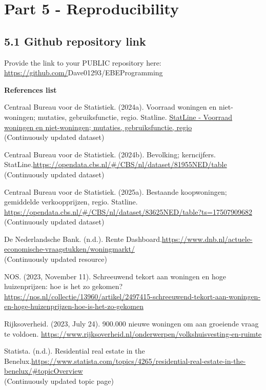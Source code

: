 \documentclass[
]{article}
\begin{document}
\section{Part 5 - Reproducibility}\label{part-5---reproducibility}

\subsection{5.1 Github repository link}\label{github-repository-link}

Provide the link to your PUBLIC repository here:
\url{https://github.com/}Dave01293/EBEProgramming

\textbf{References list}

Centraal Bureau voor de Statistiek. (2024a). Voorraad woningen en
niet-woningen; mutaties, gebruiksfunctie, regio. Statline.
\href{https://opendata.cbs.nl/statline/\#/CBS/nl/dataset/37230NED/table?fromstatweb}{StatLine
- Voorraad woningen en niet-woningen; mutaties, gebruiksfunctie, regio\\
} (Continuously updated dataset)

Centraal Bureau voor de Statistiek. (2024b). Bevolking; kerncijfers.
StatLine.\href{https://opendata.cbs.nl/\#/CBS/nl/dataset/81955NED/table}{https://opendata.cbs.nl/\#/CBS/nl/dataset/81955NED/table\\
} (Continuously updated dataset)

Centraal Bureau voor de Statistiek. (2025a). Bestaande koopwoningen;
gemiddelde verkoopprijzen, regio. Statline.
\url{https://opendata.cbs.nl/\#/CBS/nl/dataset/83625NED/table?ts=17507909682}\\
(Continuously updated dataset)

De Nederlandsche Bank. (n.d.). Rente \textbar{}
Dashboard.\href{https://www.dnb.nl/actuele-economische-vraagstukken/woningmarkt/}{https://www.dnb.nl/actuele-economische-vraagstukken/woningmarkt/\\
} (Continuously updated resource)

NOS. (2023, November 11). Schreeuwend tekort aan woningen en hoge
huizenprijzen: hoe is het zo
gekomen?\url{https://nos.nl/collectie/13960/artikel/2497415-schreeuwend-tekort-aan-woningen-en-hoge-huizenprijzen-hoe-is-het-zo-gekomen}

Rijksoverheid. (2023, July 24). 900.000 nieuwe woningen om aan groeiende
vraag te voldoen.
\url{https://www.rijksoverheid.nl/onderwerpen/volkshuisvesting-en-ruimte}

Statista. (n.d.). Residential real estate in the
Benelux.\href{https://www.statista.com/topics/4265/residential-real-estate-in-the-benelux/\#topicOverview}{https://www.statista.com/topics/4265/residential-real-estate-in-the-benelux/\#topicOverview\\
} (Continuously updated topic page)
\end{document}
